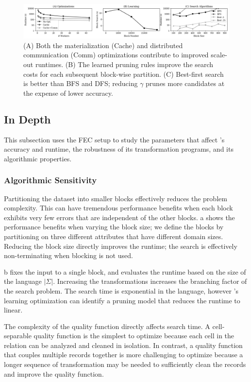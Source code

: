  \begin{figure}[t]
\centering
 \includegraphics[width=\textwidth]{exp/exp6.png}
 \caption{\small 
   (A) Both the materialization (Cache) and distributed communication (Comm) optimizations contribute to improved scale-out runtimes.
   (B) The learned pruning rules improve the search costs for each subsequent block-wise partition.  
   (C) Best-first search is better than BFS and DFS; reducing $\gamma$ prunes more candidates at the expense of lower accuracy.  
 \label{fig:opt}}
\end{figure}


\subsection{\sys In Depth}
This subsection uses the FEC setup to study the parameters that affect \sys's accuracy and runtime, the robustness of its transformation programs, and its algorithmic properties.

\subsubsection{Algorithmic Sensitivity}

 Partitioning the dataset into smaller blocks effectively reduces the problem complexity.  This can have tremendous performance benefits when each block exhibits very few errors that are independent of the other blocks.  a shows the performance benefits when varying the block size; we define the blocks by partitioning on three different attributes that have different domain sizes.  Reducing the block size directly improves the runtime; the search is effectively non-terminating when blocking is not used.    

 b fixes the input to a single block, and evaluates the runtime based on the size of the language $|\Sigma|$.  Increasing the transformations increases the branching factor of the search problem. The search time is exponential in the language, however \sys's learning optimization can identify a pruning model that reduces the runtime to linear.

 The complexity of the quality function directly affects search time.  A cell-separable quality function is the simplest to optimize because each cell in the relation can be analyzed and cleaned in isolation.  In contrast, a quality function that couples multiple records together is more challenging to optimize because a longer sequence of transformation may be needed to sufficiently clean the records and improve the quality function.  

